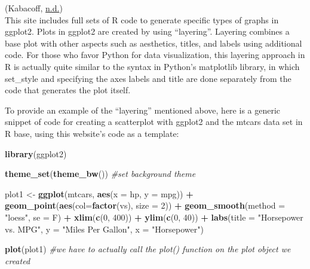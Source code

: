 \documentclass[]{book}
\newenvironment{Shaded}{\begin{snugshade}}{\end{snugshade}}
\newcommand{\CommentTok}[1]{\textcolor[rgb]{0.56,0.35,0.01}{\textit{#1}}}
\newcommand{\DataTypeTok}[1]{\textcolor[rgb]{0.13,0.29,0.53}{#1}}
\newcommand{\DecValTok}[1]{\textcolor[rgb]{0.00,0.00,0.81}{#1}}
\newcommand{\KeywordTok}[1]{\textcolor[rgb]{0.13,0.29,0.53}{\textbf{#1}}}
\newcommand{\NormalTok}[1]{#1}
\newcommand{\OperatorTok}[1]{\textcolor[rgb]{0.81,0.36,0.00}{\textbf{#1}}}
\newcommand{\StringTok}[1]{\textcolor[rgb]{0.31,0.60,0.02}{#1}}
\begin{document}
(Kabacoff, \protect\hyperlink{ref-viz_Rggplot}{n.d.})\\
This site includes full sets of R code to generate specific types of graphs in ggplot2. Plots in ggplot2 are created by using ``layering''. Layering combines a base plot with other aspects such as aesthetics, titles, and labels using additional code. For those who favor Python for data visualization, this layering approach in R is actually quite similar to the syntax in Python's matplotlib library, in which set\_style and specifying the axes labels and title are done separately from the code that generates the plot itself.

To provide an example of the ``layering'' mentioned above, here is a generic snippet of code for creating a scatterplot with ggplot2 and the mtcars data set in R base, using this website's code as a template:

\begin{Shaded}
\begin{Highlighting}[]
\KeywordTok{library}\NormalTok{(ggplot2)}

\KeywordTok{theme_set}\NormalTok{(}\KeywordTok{theme_bw}\NormalTok{())  }\CommentTok{#set background theme}

\NormalTok{plot1 <-}\StringTok{ }\KeywordTok{ggplot}\NormalTok{(mtcars, }\KeywordTok{aes}\NormalTok{(}\DataTypeTok{x =}\NormalTok{ hp, }\DataTypeTok{y =}\NormalTok{ mpg)) }\OperatorTok{+}\StringTok{ }\KeywordTok{geom_point}\NormalTok{(}\KeywordTok{aes}\NormalTok{(}\DataTypeTok{col=}\KeywordTok{factor}\NormalTok{(vs), }\DataTypeTok{size =} \DecValTok{2}\NormalTok{)) }\OperatorTok{+}\StringTok{ }\KeywordTok{geom_smooth}\NormalTok{(}\DataTypeTok{method =} \StringTok{"loess"}\NormalTok{, }\DataTypeTok{se =}\NormalTok{ F) }\OperatorTok{+}\StringTok{ }\KeywordTok{xlim}\NormalTok{(}\KeywordTok{c}\NormalTok{(}\DecValTok{0}\NormalTok{, }\DecValTok{400}\NormalTok{)) }\OperatorTok{+}\StringTok{ }\KeywordTok{ylim}\NormalTok{(}\KeywordTok{c}\NormalTok{(}\DecValTok{0}\NormalTok{, }\DecValTok{40}\NormalTok{)) }\OperatorTok{+}\StringTok{ }\KeywordTok{labs}\NormalTok{(}\DataTypeTok{title =} \StringTok{"Horsepower vs. MPG"}\NormalTok{, }\DataTypeTok{y =} \StringTok{"Miles Per Gallon"}\NormalTok{, }\DataTypeTok{x =} \StringTok{"Horsepower"}\NormalTok{)}

\KeywordTok{plot}\NormalTok{(plot1)  }\CommentTok{#we have to actually call the plot() function on the plot object we created}
\end{Highlighting}
\end{Shaded}
\end{document}

